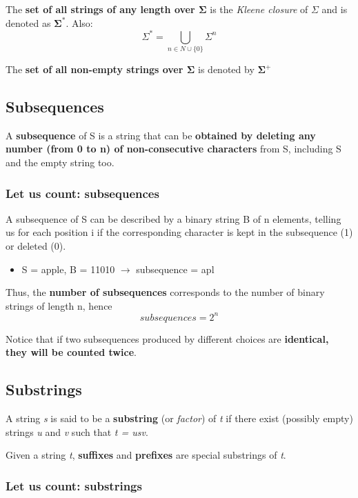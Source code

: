 \documentclass[12pt, letterpaper]{article}
\begin{document}
The \textbf{set of all strings of any length over $\mathbf{\Sigma}$} is the \emph{Kleene closure} of $\Sigma$ and is denoted as $\mathbf{\Sigma^*}$. Also: 
$$
\Sigma^* = \bigcup_{n \in {N} \cup \{0\}} \Sigma^n
$$

The \textbf{set of all non-empty strings over $\mathbf{\Sigma}$} is denoted by $\mathbf{\Sigma^+}$

\subsection{Subsequences}

A \textbf{subsequence} of S is a string that can be \textbf{obtained by deleting any number (from 0 to n) of non-consecutive characters} from S, including S and the empty string too.

\subsubsection{Let us count: subsequences}

A subsequence of S can be described by a binary string B of n elements, telling us for each position i if the corresponding character is kept in the subsequence (1) or deleted (0).

\begin{itemize}
\item S = apple, B = 11010 $\rightarrow$ subsequence = apl
\end{itemize}

Thus, the \textbf{number of subsequences} corresponds to the number of binary strings of length n, hence 
$$
subsequences = 2^n
$$

Notice that if two subsequences produced by different choices are \textbf{identical, they will be counted twice}.

\subsection{Substrings}

A string \emph{s} is said to be a \textbf{substring} (or \emph{factor}) of \emph{t} if there exist (possibly empty) strings \emph{u} and \emph{v} such that \emph{t = usv}.

Given a string \emph{t}, \textbf{suffixes} and \textbf{prefixes} are special substrings of \emph{t}.

\subsubsection{Let us count: substrings}
\end{document}
